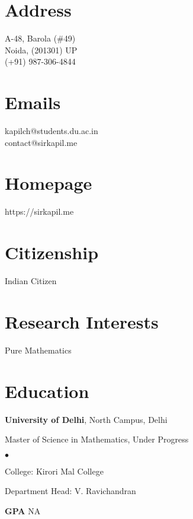 \documentclass[margin,line]{res}
\newenvironment{list1}{
  \begin{list}{\ding{113}}{%
      \setlength{\itemsep}{0in}
      \setlength{\parsep}{0in} \setlength{\parskip}{0in}
      \setlength{\topsep}{0in} \setlength{\partopsep}{0in}
      \setlength{\leftmargin}{0.17in}}}{\end{list}}
\newenvironment{list2}{
  \begin{list}{$\bullet$}{%
      \setlength{\itemsep}{0in}
      \setlength{\parsep}{0in} \setlength{\parskip}{0in}
      \setlength{\topsep}{0in} \setlength{\partopsep}{0in}
      \setlength{\leftmargin}{0.2in}}}{\end{list}}
\begin{document}

\begin{resume}
\section{\sc Address}
\onehalfspacing
A-48, Barola (\#49) \\
Noida, (201301) UP \\
(+91) 987-306-4844

\section{\sc Emails}
kapilch@students.du.ac.in \\ 
contact@sirkapil.me

\section{\sc Homepage}
https://sirkapil.me

\section{\sc Citizenship}
Indian Citizen

\section{\sc Research Interests}
Pure Mathematics
\vspace{0.1in}
\section{\sc Education}
{\bf University of Delhi}, North Campus, Delhi\\
\vspace*{-.1in}
\begin{list1}
\item[] Master of Science in Mathematics, Under Progress
\begin{list2}
\vspace*{.05in}
\item College:  Kirori Mal College
\item Department Head:  V. Ravichandran
\item[] {\bf \footnotesize GPA} NA
\end{list2}
\vspace*{.05in}
\end{list1}


\end{resume}
\end{document}
